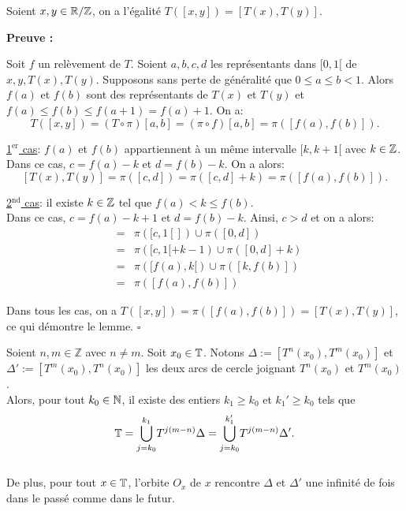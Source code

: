 \vspace{3mm}



\begin{lemma}\label{T[x;y]}
	Soient  $x,y \in {\mathbb{R}}/{\mathbb{Z}}$, on a l'égalité $T([x,y])=[T(x),T(y)].$
\end{lemma}

	\textbf{Preuve :}
	\par Soit $f$ un relèvement de $T$. Soient $a, b, c, d$ les représentants dans $[0,1[$ de $x,y,T(x),T(y)$. Supposons sans perte de généralité que $0\leq a\leq b <1$. Alors $f(a)$ et $f(b)$ sont des représentants de $T(x)$ et $T(y)$ et $f(a)\leq f(b) \leq f(a+1)=f(a)+1$. On a:
		$$T([x,y])=(T\circ\pi)[a,b]=(\pi\circ f)[a,b]=\pi([f(a),f(b)]).$$

	\par \underline{1$^{\mathrm{er}}$ cas}: $f(a)$ et $f(b)$ appartiennent à un même intervalle $[k,k+1[$ avec $k \in {\mathbb{Z}}$.\\
	Dans ce cas, $c=f(a)-k$ et $d=f(b)-k$. On a alors:
	$$[T(x),T(y)]=\pi([c,d])=\pi([c,d]+k)=\pi([f(a),f(b)]).$$

	\par \underline{2$^{\mathrm{nd}}$ cas}: il existe $k \in {\mathbb{Z}}$ tel que $f(a)<k\leq f(b)$.\\
	Dans ce cas, $c=f(a)-k+1$ et $d=f(b)-k$. Ainsi, $c>d$ et on a alors:
	\begin{eqnarray*}
			[T(x),T(y)]&=&\pi([c,1[])\cup\pi([0,d])\\
			&=&\pi([c,1[+k-1)\cup\pi([0,d]+k)\\
			&=&\pi([f(a),k[)\cup\pi([k,f(b)])\\
			&=&\pi([f(a),f(b)])
	\end{eqnarray*}

	\par Dans tous les cas, on a $T([x,y])=\pi([f(a),f(b)])=[T(x),T(y)]$, ce qui démontre le lemme. \hfill $\square$\\


















\begin{lemma}\label{delta orbite}
	Soient $n,m \in \mathbb{Z}$ avec $n\neq m$. Soit $x_0 \in {\mathbb{T}}$. Notons $\Delta := [T^n(x_0),T^m(x_0)]$ et $\Delta':=[T^m(x_0),T^n(x_0)]$ les deux arcs de cercle joignant $T^n(x_0)$ et $T^m(x_0)$.\\ Alors, pour tout $k_0 \in {\mathbb{N}}$, il existe des entiers $k_1\geq k_0$ et $k_1'\geq k_0$ tels que $${\mathbb{T}}=\overset{k_1}{\underset{j=k_0}{\bigcup}}T^{j(m-n)}\Delta=\overset{k_1'}{\underset{j=k_0}{\bigcup}}T^{j(m-n)}\Delta'.$$ \\De plus, pour tout $x \in {\mathbb{T}}$, l'orbite $O_x$ de $x$ rencontre $\Delta$ et $\Delta'$ une infinité de fois dans le passé comme dans le futur.
\end{lemma}

